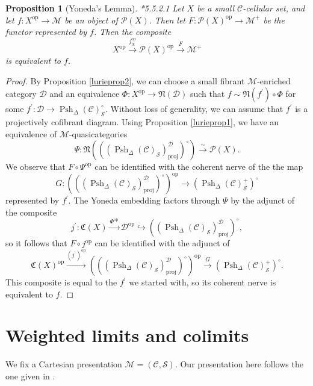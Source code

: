 \documentclass{amsart}
\numberwithin{equation}{section}
\theoremstyle{plain}   %
\newtheorem{prop}[subsection]{Proposition}
\theoremstyle{remark}
\theoremstyle{plain}
\newcommand{\op}{\ensuremath{\mathrm{op}}}
\newcommand{\C}{\ensuremath{\mathcal{C}}}
\newcommand{\M}{\ensuremath{\mathcal{M}}}
\newcommand{\Pre}{\ensuremath{\mathcal{P}}}
\newcommand{\setS}{\ensuremath{\mathscr{S}}}
\newcommand{\spsh}{\ensuremath{\operatorname{Psh}_\Delta(\mathcal{C})}}
\begin{document}
\begin{prop}[Yoneda's Lemma]\cite{htt}*{5.5.2.1}
	Let \(X\) be a small \(\C\)-cellular set, and let \(f: X^\op \to \M\) be an object of \(\Pre(X)\).  Then let \(F:\Pre(X)^\op \to \M^+\) be the functor represented by \(f\).  Then the composite \[X^\op\xrightarrow{j^\op_X} \Pre(X)^\op \xrightarrow{F} \M^+\] is equivalent to \(f\).
\end{prop}
\begin{proof}
	By Proposition \ref{lurieprop2}, we can choose a small fibrant \(\M\)-enriched category \(\mathcal{D}\) and an equivalence \(\Phi:X^\op\to \mathfrak{N}(\mathcal{D})\) such that \(f\sim \mathfrak{N}(f^\prime) \circ \Phi\) for some \(f^\prime:\mathcal{D} \to \spsh_\setS^\circ\).  Without loss of generality, we can assume that \(f^\prime\) is a projectively cofibrant diagram.  Using Proposition \ref{lurieprop1}, we have an equivalence of \(\M\)-quasicategories 
	\[\Psi:\mathfrak{N}\left(\left((\spsh_\setS)_\mathrm{proj}^\mathcal{D}\right)^\circ\right) \xrightarrow{\sim} \Pre(X).\] 
	We observe that \(F\circ \Psi^\op\) can be identified with the coherent nerve of the the map 
	\[G: \left(\left((\spsh_\setS)_\mathrm{proj}^\mathcal{D}\right)^\circ\right)^\op \to \left(\spsh^{+}_\setS\right)^\circ\] represented by \(f^\prime\).  The Yoneda embedding factors through \(\Psi\) by the adjunct of the composite 
	\[j^\prime:\mathfrak{C}(X)\xrightarrow{\Phi^\op} \mathcal{D}^\op \hookrightarrow \left((\spsh_\setS)_\mathrm{proj}^\mathcal{D}\right)^\circ,\]
	so it follows that \(F\circ j^\op\) can be identified with the adjunct of 
	\[\mathfrak{C}(X)^\op \xrightarrow{(j^\prime)^\op} \left(\left((\spsh_\setS)_\mathrm{proj}^\mathcal{D}\right)^\circ\right)^\op \xrightarrow{G} \left(\spsh^{+}_\setS\right)^\circ.\]
	This composite is equal to the \(f^\prime\) we started with, so its coherent nerve is equivalent to \(f\).
\end{proof}

\section{Weighted limits and colimits}
We fix a Cartesian presentation \(\M=(\C,\setS)\).  Our presentation here follows the one given in \cite{nlabwlim}.
\end{document}
